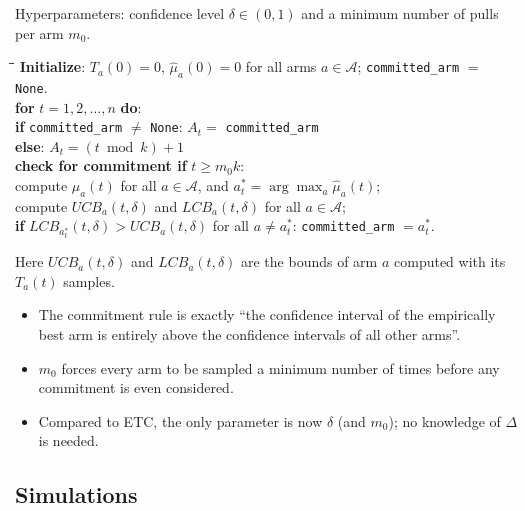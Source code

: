 \begin{definition}
Hyperparameters: confidence level $\delta \in (0,1)$ and a minimum number of pulls per arm $m_0$.

\begin{tabbing}
\hspace{1.5em}\=\hspace{1.5em}\=\hspace{1.5em}\=\kill
\textbf{Initialize}: $T_a(0) = 0$, $\hat{\mu}_a(0) = 0$ for all arms $a \in \mathcal{A}$; \texttt{committed\_arm} $=$ \texttt{None}. \\
\textbf{for} $t = 1, 2, \dots, n$ \textbf{do}: \\
\> \textbf{if} \texttt{committed\_arm} $\neq$ \texttt{None}: $A_t = $ \texttt{committed\_arm} \\
\> \textbf{else}: $A_t = (t \bmod k) + 1$ \\
\> \> \textbf{check for commitment if} $t \geq m_0 k$: \\
\> \> \> compute $\hat{\mu}_a(t)$ for all $a \in \mathcal{A}$, and $a^*_t = \arg\max_a \hat{\mu}_a(t)$; \\
\> \> \> compute $UCB_a(t, \delta)$ and $LCB_a(t, \delta)$ for all $a \in \mathcal{A}$; \\
\> \> \> \textbf{if} $LCB_{a^*_t}(t, \delta) > UCB_a(t, \delta)$ for all $a \neq a^*_t$: \texttt{committed\_arm} $= a^*_t$.
\end{tabbing}
Here $UCB_a(t,\delta)$ and $LCB_a(t,\delta)$ are the bounds of arm $a$ computed with its $T_a(t)$ samples.
\end{definition}

\begin{remark}
\begin{itemize}
    \item The commitment rule is exactly ``the confidence interval of the empirically best arm is entirely above the confidence intervals of all other arms''.
    \item $m_0$ forces every arm to be sampled a minimum number of times before any commitment is even considered.
    \item Compared to ETC, the only parameter is now $\delta$ (and $m_0$); no knowledge of $\Delta$ is needed.
\end{itemize}
\end{remark}

\subsection{Simulations}

